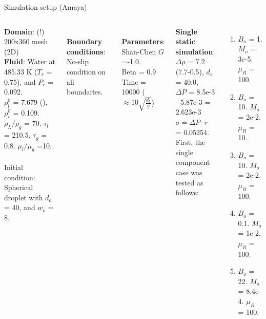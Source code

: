 \documentclass[8pt]{beamer}
\begin{document}
	
	\begin{frame}[t]{Simulation setup (Amaya)}
		\justifying
		\begin{columns}[t]
			
			\textbf{Domain}: (!) 200x360 mesh (2D)\\
			\textbf{Fluid}: Water at 485.33 K ($T_r$ = 0.75), and $P_r$ = 0.092. \\$\rho_l^0$  = 7.679 (), $\rho_v^0$  = 0.109. $\rho_L/\rho_g$ = 70. $\tau_l$ = 210.5. $\tau_g$ = 0.8. $\mu_l/\mu_g$ =10.\\~\\
			Initial condition: Spherical droplet with $d_o$ = 40, and $w_o$ = 8.
			
			~\\
			\textbf{Boundary conditions}: No-slip condition on all boundaries.
			
			~\\
			\textbf{Parameters}: Shan-Chen $G$=-1.0. \\
			Beta = 0.9\\
			Time = 10000 ($\approx 10 \sqrt{\frac{d_b}{g}}$)\\
			~\\
			
			
		
			
		
			\textbf{Single static simulation}:\\ $\Delta \rho $ = 7.2 (7.7-0.5), $d_s$ = 40.0, \\ $\Delta P$ = 8.5e-3 - 5.87e-3 = 2.623e-3 \\$\sigma = \Delta P \cdot r$ = 0.05254.\\
			
			
			First, the single component case was tested as follows:
			\begin{enumerate}
				\item $B_o$ = 1. $M_o$ = 3e-5. $\mu_R$ = 100. 
				\item $B_o$ = 10. $M_o$ = 2e-2. $\mu_R$ = 10.
				\item $B_o$ = 10. $M_o$ = 2e-2. $\mu_R$ = 100. 
				\item $B_o$ = 0.1. $M_o$ = 1e-2. $\mu_R$ = 100.
				\item $B_o$ = 22. $M_o$ = 8.4e-4. $\mu_R$ = 100. 
			\end{enumerate}
		\end{columns}
	\end{frame}
	
\end{document}
